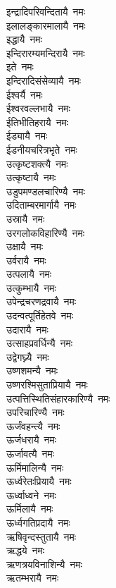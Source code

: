 \begin{multicols}{\maxColumns}
\begin{flushleft}
इन्द्रादिपरिवन्दितायै~नमः\hfill{}\\
इलालङ्कारमालायै~नमः\\
इद्धायै~नमः\\
इन्दिरारम्यमन्दिरायै~नमः\\
इते~नमः\\
इन्दिरादिसंसेव्यायै~नमः\\
ईश्वर्यै~नमः\\
ईश्वरवल्लभायै~नमः\\
ईतिभीतिहरायै~नमः\\
ईड्यायै~नमः\\
ईडनीयचरित्रभृते~नमः\hfill{}\\
उत्कृष्टशक्त्यै~नमः\\
उत्कृष्टायै~नमः\\
उडुपमण्डलचारिण्यै~नमः\\
उदिताम्बरमार्गायै~नमः\\
उस्रायै~नमः\\
उरगलोकविहारिण्यै~नमः\\
उक्षायै~नमः\\
उर्वरायै~नमः\\
उत्पलायै~नमः\\
उत्कुम्भायै~नमः\hfill{}\\
उपेन्द्रचरणद्रवायै~नमः\\
उदन्वत्पूर्तिहेतवे~नमः\\
उदारायै~नमः\\
उत्साहप्रवर्धिन्यै~नमः\\
उद्वेगघ्न्यै~नमः\\
उष्णशमन्यै~नमः\\
उष्णरश्मिसुताप्रियायै~नमः\\
उत्पत्तिस्थितिसंहारकारिण्यै~नमः\\
उपरिचारिण्यै~नमः\\
ऊर्जंवहन्त्यै~नमः\hfill{}\\
ऊर्जधरायै~नमः\\
ऊर्जावत्यै~नमः\\
ऊर्मिमालिन्यै~नमः\\
ऊर्ध्वरेतःप्रियायै~नमः\\
ऊर्ध्वाध्वने~नमः\\
ऊर्मिलायै~नमः\\
ऊर्ध्वगतिप्रदायै~नमः\\
ऋषिवृन्दस्तुतायै~नमः\\
ऋद्धये~नमः\\
ऋणत्रयविनाशिन्यै~नमः\hfill{}\\
ऋतम्भरायै~नमः\\

\end{flushleft}
\end{multicols}
